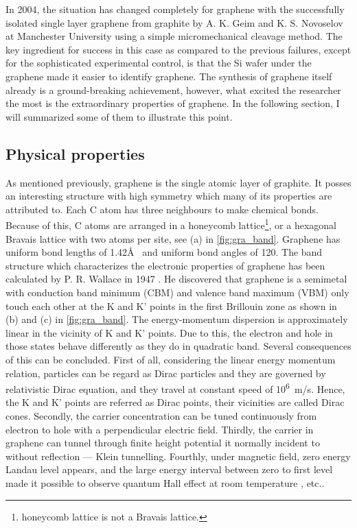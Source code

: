 In 2004, the situation has changed completely for graphene with the successfully isolated single layer graphene from graphite by A. K. Geim and K. S. Novoselov at Manchester University using a simple micromechanical cleavage method. The key ingredient for success in this case as compared to the previous failures\cite{Krishnan1997,Ohashi1997}, except for the sophisticated experimental control, is that the Si wafer under the graphene made it easier to identify graphene\cite{Geim2007}. The synthesis of graphene itself already is a ground-breaking achievement, however, what excited the researcher the most is the extraordinary properties of graphene. In the following section, I will summarized some of them to illustrate this point.

\subsection{Physical properties}

As mentioned previously, graphene is the single atomic layer of graphite. It posses an interesting structure with high symmetry which many of its properties are attributed to. Each C atom has three neighbours to make chemical bonds. Because of this, C atoms are arranged in a honeycomb lattice\footnote{honeycomb lattice is not a Bravais lattice.}, or a hexagonal Bravais lattice with two atoms per site, see (a) in \autoref{fig:gra_band}. Graphene has uniform bond lengths of 1.42\AA~ and uniform bond angles of 120\textdegree. The band structure which characterizes the electronic properties of graphene has been calculated by P. R. Wallace in 1947 \cite{Wallace1947}. He discovered that graphene is a semimetal with conduction band minimum (CBM) and valence band maximum (VBM) only touch each other at the K and K' points in the first Brillouin zone as shown in (b) and (c) in \autoref{fig:gra_band}. The energy-momentum dispersion is approximately linear in the vicinity of K and K' points. Due to this, the electron and hole in those states behave differently as they do in quadratic band. Several consequences of this can be concluded. First of all, considering the linear energy momentum relation, particles can be regard as Dirac particles and they are governed by relativistic Dirac equation\cite{Novoselov2005}, and they travel at constant speed of \si{10^6m/s}. Hence, the K and K' points are referred as Dirac points, their vicinities are called Dirac cones. Secondly, the carrier concentration can be tuned continuously from electron to hole with a perpendicular electric field\cite{Geim2007}. Thirdly, the carrier in graphene can tunnel through finite height potential it normally incident to without reflection — Klein tunnelling\cite{Katsnelson2006}. Fourthly, under magnetic field, zero energy Landau level appears, and the large energy interval between zero to first level made it possible to observe quantum Hall effect at room temperature \cite{Novoselov1379}, etc..

